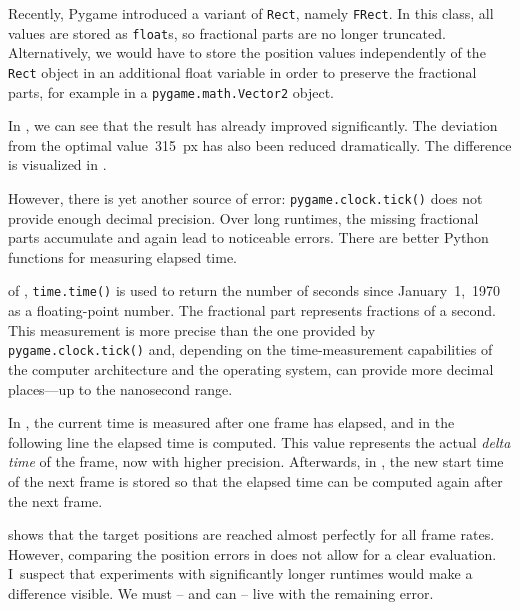 Recently, Pygame introduced a variant of \texttt{Rect}, namely \texttt{FRect}. In this class, all values are stored as \texttt{float}s, so fractional parts are no longer truncated. Alternatively, we would have to	store the position values independently of the \texttt{Rect} object in an additional float variable in order to preserve the fractional parts, for example in a \texttt{pygame.math.Vector2} object.
 
\newpage 
{}

In , we can see that the result has already improved significantly. The deviation from the optimal value~\SI{315}{px} has also been reduced dramatically. The difference is visualized in .


However, there is yet another source of error: \texttt{pygame.clock.tick()} does not provide enough decimal precision. Over long runtimes, the missing fractional parts accumulate and again lead to noticeable errors. There are better Python functions for measuring elapsed time.

 of , \texttt{time.time()} is used to return the number of seconds since January~1,~1970 as a floating-point number. The fractional part represents fractions of a second. This measurement is more precise than the one provided by \texttt{pygame.clock.tick()} and, depending on the time-measurement capabilities of the computer architecture and the operating system, can provide more decimal places—up to the nanosecond range.

In , the current time is measured after one frame has elapsed, and in the following line the elapsed time is computed. This value represents the actual \emph{delta time} of the frame, now with higher precision. Afterwards, in , the new start time of the next frame is stored so that the elapsed time can be computed again after the next frame.

 shows that the target positions are reached almost perfectly for all frame rates. However, comparing the position errors in  does not allow for a clear evaluation. I~suspect that experiments with significantly longer runtimes would make a difference visible. We must -- and can -- live with the remaining error.

